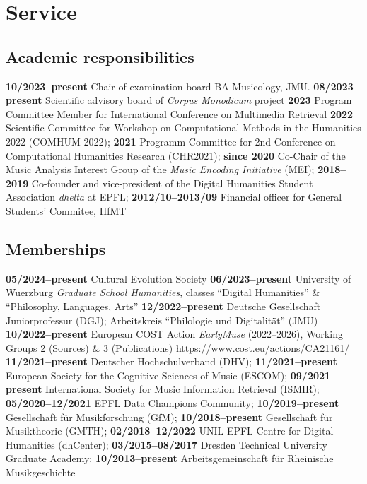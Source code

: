 \section{Service}

\subsection{Academic responsibilities}

\textbf{10/2023--present} Chair of examination board BA Musicology, JMU. 
\textbf{08/2023--present} Scientific advisory board of \textit{Corpus Monodicum} project
\textbf{2023} Program Committee Member for International Conference on Multimedia
Retrieval
\textbf{2022} Scientific Committee for Workshop on Computational Methods in the Humanities 2022 (COMHUM 2022);
\textbf{2021} Programm Committee for 2nd Conference on Computational Humanities Research (CHR2021);
\textbf{since 2020} Co-Chair of the Music Analysis Interest Group of the \emph{Music Encoding Initiative} (MEI);
\textbf{2018--2019} Co-founder and vice-president of the Digital Humanities Student Association \emph{dhelta} at EPFL;
\textbf{2012/10--2013/09} Financial officer for General Students' Commitee, HfMT

\subsection{Memberships}

\textbf{05/2024--present} Cultural Evolution Society
\textbf{06/2023--present} University of Wuerzburg \emph{Graduate School Humanities}, classes ``Digital Humanities'' \& ``Philosophy, Languages, Arts''
\textbf{12/2022--present} Deutsche Gesellschaft Juniorprofessur (DGJ); Arbeitskreis ``Philologie und Digitalität'' (JMU)
\textbf{10/2022--present} European COST Action \emph{EarlyMuse} (2022--2026), Working Groups 2 (Sources) \& 3 (Publications) \url{https://www.cost.eu/actions/CA21161/}
\textbf{11/2021--present} Deutscher Hochschulverband (DHV);
\textbf{11/2021--present} European Society for the Cognitive Sciences of Music (ESCOM);
\textbf{09/2021--present} International Society for Music Information Retrieval (ISMIR);
\textbf{05/2020--12/2021} EPFL Data Champions Community;
\textbf{10/2019--present} Gesellschaft f{\"u}r Musikforschung (GfM);
\textbf{10/2018--present} Gesellschaft f{\"u}r Musiktheorie (GMTH);
\textbf{02/2018--12/2022} UNIL-EPFL Centre for Digital Humanities (dhCenter);
\textbf{03/2015--08/2017} Dresden Technical University Graduate Academy;
\textbf{10/2013--present} Arbeitsgemeinschaft für Rheinische Musikgeschichte

